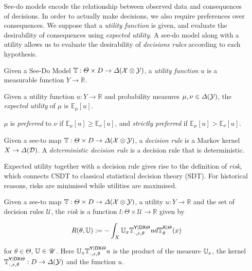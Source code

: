 See-do models encode the relationship between observed data and consequences of decisions. In order to actually make decisions, we also require preferences over consequences. We suppose that a \emph{utility function} is given, and evaluate the desirability of consequences using \emph{expected utility}. A see-do model along with a utility allows us to evaluate the desirability of \emph{decisions rules} according to each hypothesis.

\begin{definition}
Given a See-Do Model $\mathbb{T}:\Theta\times D\to \Delta(\mathcal{X}\otimes\mathcal{Y})$, a \emph{utility function} $u$ is a measurable function $Y\to \mathbb{R}$. 
\end{definition}

\begin{definition}
Given a utility function $u:Y\to \mathbb{R}$ and probability measures $\mu,\nu\in \Delta(\mathcal{Y})$, the \emph{expected utility} of $\mu$ is $\mathbb{E}_{\mu}[u]$.

$\mu$ is \emph{preferred} to $\nu$ if $\mathbb{E}_{\mu}[u]\geq \mathbb{E}_{\nu}[u]$, and \emph{strictly preferred} if $\mathbb{E}_{\mu}[u]>\mathbb{E}_{\nu}[u]$.
\end{definition}

\begin{definition}
Given a see-to map $\mathbb{T}:\Theta\times D\to \Delta(\mathcal{X}\otimes\mathcal{Y})$, a \emph{decision rule} is a Markov kernel $X\to \Delta(\mathcal{D})$. A \emph{deterministic decision rule} is a decision rule that is deterministic.

\end{definition}

Expected utility together with a decision rule gives rise to the definition of \emph{risk}, which connects CSDT to classical statistical decision theory (SDT). For historical reasons, risks are minimised while utilities are maximised.

\begin{definition}[Risk]
Given a see-to map $\mathbb{T}:\Theta\times D\to \Delta(\mathcal{X}\otimes\mathcal{Y})$, a utility $u:Y\to \mathbb{R}$ and the set of decision rules $\mathscr{U}$, the \emph{risk} is a function $l:\Theta\times \mathscr{U}\to \mathbb{R}$ given by

\begin{align}
    R(\theta,\mathbb{U}) := - \int_X  \mathbb{U}_x \mathbb{T}^{\mathsf{Y}|\mathsf{D}\mathsf{X}\Theta}_{\cdot,x,\theta} u d\mathbb{T}^{\mathsf{X}|\Theta}_\theta(x)
\end{align}

for $\theta\in \Theta$, $\mathbb{U}\in \mathscr{U}$. Here $\mathbb{U}_x \mathbb{T}^{\mathsf{Y}|\mathsf{D}\mathsf{X}\Theta}_{\cdot,x,\theta} u$ is the product of the measure $\mathbb{U}_x$, the kernel $\mathbb{T}^{\mathsf{Y}|\mathsf{D}\mathsf{X}\Theta}_{\cdot,x,\theta}:D\to \Delta(\mathcal{Y})$ and the function $u$.
\end{definition}

